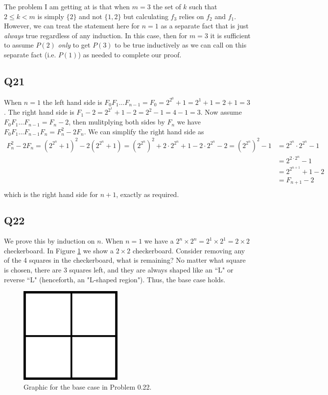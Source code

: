 \documentclass[12pt]{article}
\numberwithin{theorem}{section}
\numberwithin{equation}{section}
\numberwithin{remark}{section}
\numberwithin{definition}{section}
\numberwithin{theorem}{section}
\numberwithin{lemma}{section}
\numberwithin{example}{section}
\begin{document}
The problem I am getting at is that when $m=3$ the set of $k$ such that $2\le k < m$ is simply $\{2\}$ and not $\{1,2\}$ but calculating $f_3$ relies on $f_2$ and $f_1$. However, we can treat the statement here for $n=1$ as a separate fact that is just \emph{always} true regardless of any induction. In this case, then for $m=3$ it is sufficient to assume $P(2)$ \emph{only} to get $P(3)$ to be true inductively as we can call on this separate fact (i.e. $P(1)$) as needed to complete our proof. 



\subsection{Q21}

When $n=1$ the left hand side is $F_0F_1\ldots F_{n-1}=F_0=2^{2^0}+1=2^1+1=2+1=3$. The right hand side is $F_1 - 2 = 2^{2^{1}}+1-2=2^2-1=4-1=3$. Now assume $F_0F_1\ldots F_{n-1}=F_n-2$, then mulitplying both sides by $F_n$ we have $F_0F_1\ldots F_{n-1}F_n=F_n^2-2F_n$. We can simplify the right hand side as 
\begin{align*}
	F_n^2-2F_n = \left(2^{2^n}+1\right)^2-2\left(2^{2^n}+1\right)=\left(2^{2^n}\right)^2+2\cdot 2^{2^n}+1-2\cdot 2^{2^n} - 2 = \left(2^{2^n}\right)^2-1 & = 2^{2^n}\cdot 2^{2^n}-1\\
	& = 2^{2\cdot2^n}-1\\
	& = 2^{2^{n+1}}+1-2\\
	& = F_{n+1}-2\\
\end{align*}
which is the right hand side for $n+1$, exactly as required. 



\subsection{Q22}

We prove this by induction on $n$. When $n=1$ we have a $2^{n}\times2^{n}=2^{1}\times2^1=2\times2$ checkerboard. In Figure \ref{fig:problem_0.22_0} we show a $2\times2$ checkerboard. Consider removing any of the 4 squares in the checkerboard, what is remaining? No matter what square is chosen, there are 3 squares left, and they are always shaped like an ``L" or reverse ``L" (henceforth, an "L-shaped region"). Thus, the base case holds. 

\begin{figure}
	\begin{center}
		\includegraphics[width=2in]{fig/problem_0.22_0.png}
		\caption{Graphic for the base case in Problem 0.22.}
		\label{fig:problem_0.22_0}
	\end{center}
\end{figure}
\end{document}
